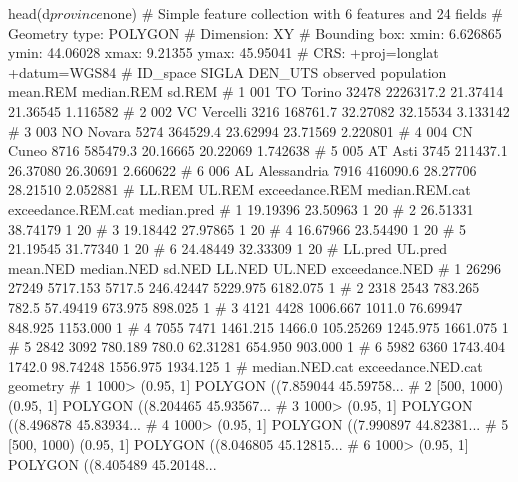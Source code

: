 \begin{example}
head(d$province$none)
# Simple feature collection with 6 features and 24 fields
# Geometry type: POLYGON
# Dimension:     XY
# Bounding box:  xmin: 6.626865 ymin: 44.06028 xmax: 9.21355 ymax: 45.95041
# CRS:           +proj=longlat +datum=WGS84
# ID_space SIGLA     DEN_UTS observed population mean.REM median.REM   sd.REM
# 1      001    TO      Torino    32478  2226317.2 21.37414   21.36545 1.116582
# 2      002    VC    Vercelli     3216   168761.7 32.27082   32.15534 3.133142
# 3      003    NO      Novara     5274   364529.4 23.62994   23.71569 2.220801
# 4      004    CN       Cuneo     8716   585479.3 20.16665   20.22069 1.742638
# 5      005    AT        Asti     3745   211437.1 26.37080   26.30691 2.660622
# 6      006    AL Alessandria     7916   416090.6 28.27706   28.21510 2.052881
# LL.REM   UL.REM exceedance.REM median.REM.cat exceedance.REM.cat median.pred
# 1 19.19396 23.50963              1           20%
# 2 26.51331 38.74179              1           20%
# 3 19.18442 27.97865              1           20%
# 4 16.67966 23.54490              1           20%
# 5 21.19545 31.77340              1           20%
# 6 24.48449 32.33309              1           20%
# LL.pred UL.pred mean.NED median.NED    sd.NED   LL.NED   UL.NED exceedance.NED
# 1   26296   27249 5717.153     5717.5 246.42447 5229.975 6182.075              1
# 2    2318    2543  783.265      782.5  57.49419  673.975  898.025              1
# 3    4121    4428 1006.667     1011.0  76.69947  848.925 1153.000              1
# 4    7055    7471 1461.215     1466.0 105.25269 1245.975 1661.075              1
# 5    2842    3092  780.189      780.0  62.31281  654.950  903.000              1
# 6    5982    6360 1743.404     1742.0  98.74248 1556.975 1934.125              1
# median.NED.cat exceedance.NED.cat                       geometry
# 1          1000>          (0.95, 1] POLYGON ((7.859044 45.59758...
# 2    [500, 1000)          (0.95, 1] POLYGON ((8.204465 45.93567...
# 3          1000>          (0.95, 1] POLYGON ((8.496878 45.83934...
# 4          1000>          (0.95, 1] POLYGON ((7.990897 44.82381...
# 5    [500, 1000)          (0.95, 1] POLYGON ((8.046805 45.12815...
# 6          1000>          (0.95, 1] POLYGON ((8.405489 45.20148...
\end{example}

